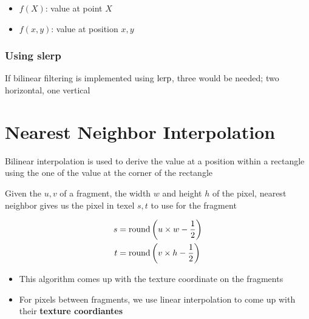   \begin{itemize}
    \item $ f\left( X \right) $: value at point $ X $
    \item $ f\left( x, y \right) $: value at position $ x, y $
  \end{itemize}

  \subsubsection{Using slerp}

    If bilinear filtering is implemented using $ \operatorname{lerp} $, three would be needed;
    two horizontal, one vertical

\section{Nearest Neighbor Interpolation}

  Bilinear interpolation is used to derive the value at a position within
  a rectangle using the one of the value at the corner of the rectangle

  Given the $ u, v $ of a fragment, the width $ w $ and height $ h $ of the
  pixel, nearest neighbor gives us the pixel in texel $ s, t $ to use for
  the fragment

  \begin{align}
    s &= \operatorname{round}\left( u \times w - \frac{1}{2} \right) \\
    t &= \operatorname{round}\left( v \times h - \frac{1}{2} \right)
  \end{align}

  \begin{itemize}
    \item This algorithm comes up with the texture coordinate on the
    fragments
    \item For pixels between fragments, we use linear interpolation to come
    up with their \textbf{texture coordiantes}
  \end{itemize}
